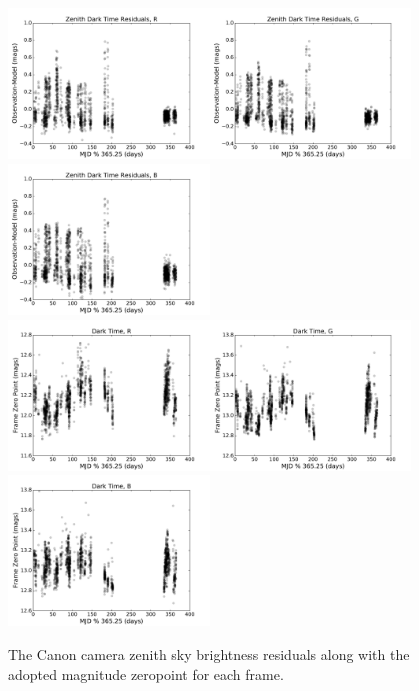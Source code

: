 \documentclass[]{spie}
\begin{document}
\begin{figure}[ht]
\begin{center}
  \includegraphics[height=4cm]{plots/residTOY_R.pdf}\includegraphics[height=4cm]{plots/residTOY_G.pdf}\includegraphics[height=4cm]{plots/residTOY_B.pdf} \\
  \includegraphics[height=4cm]{plots/zpTOY_R.pdf}\includegraphics[height=4cm]{plots/zpTOY_G.pdf}\includegraphics[height=4cm]{plots/zpTOY_B.pdf}
  \end{center}
  \caption{The Canon camera zenith sky brightness residuals along with the adopted magnitude zeropoint for each frame. \label{fig:timeOfYear}}
\end{figure}
\end{document}
